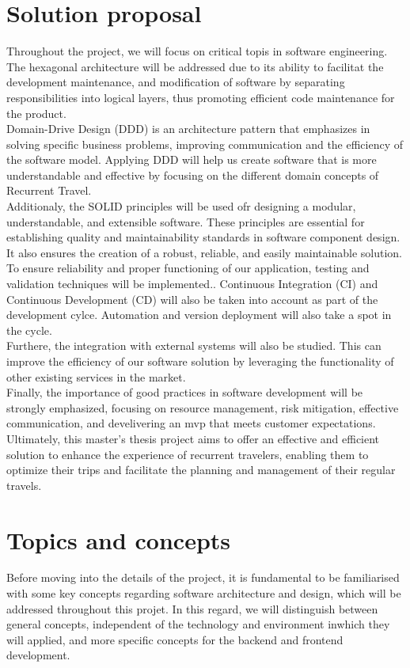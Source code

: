 \documentclass[../memory.tex]{subfiles}
\begin{document}
\section{Solution proposal}
Throughout the project, we will focus on critical topis in software engineering.
The hexagonal architecture will be addressed due to its ability to facilitat the
development maintenance, and modification of software by separating
responsibilities into logical layers, thus promoting efficient code maintenance
for the product.
\\[8pt]
Domain-Drive Design (DDD) is an architecture pattern that emphasizes in solving
specific business problems, improving communication and the efficiency of the
software model. Applying DDD will help us create software that is more
understandable and effective by focusing on the different domain concepts of
Recurrent Travel.
\\[8pt]
Additionaly, the SOLID principles will be used ofr designing a modular,
understandable, and extensible software. These principles are essential for
establishing quality and maintainability standards in software component design.
It also ensures the creation of a robust, reliable, and easily maintainable
solution.
\\[8pt]
To ensure reliability and proper functioning of our application, testing and
validation techniques will be implemented.. Continuous Integration (CI) and
Continuous Development (CD) will also be taken into account as part of the
development cylce. Automation and version deployment will also take a spot in
the cycle.
\\[8pt]
Furthere, the integration with external systems will also be studied. This can
improve the efficiency of our software solution by leveraging the functionality
of other existing services in the market.
\\[8pt]
Finally, the importance of good practices in software development will be
strongly emphasized, focusing on resource management, risk mitigation, effective
communication, and develivering an mvp that meets customer expectations.
\\
Ultimately, this master's thesis project aims to offer an effective and
efficient solution to enhance the experience of recurrent travelers, enabling
them to optimize their trips and facilitate the planning and management of their
regular travels.
\section{Topics and concepts}
Before moving into the details of the project, it is fundamental to be
familiarised with some key concepts regarding software architecture and design,
which will be addressed throughout this projet. In this regard, we will
distinguish between general concepts, independent of the technology and
environment inwhich they will applied, and more specific concepts for the
backend and frontend development.
\end{document}
